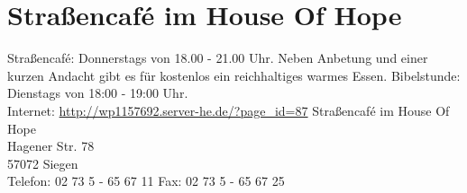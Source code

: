 \section{Straßencafé im House Of Hope}
Straßencafé: Donnerstags von 18.00 - 21.00 Uhr. Neben Anbetung und einer kurzen Andacht gibt es für kostenlos ein reichhaltiges warmes Essen. Bibelstunde: Dienstags von 18:00 - 19:00 Uhr.\\
Internet: \href{http://wp1157692.server-he.de/?page_id=87}{http://wp1157692.server-he.de/?page\_id=87} 
Straßencafé im House Of Hope\\
Hagener Str. 78\\
57072 Siegen\\
Telefon: 02 73 5 - 65 67 11 
Fax: 02 73 5 - 65 67 25